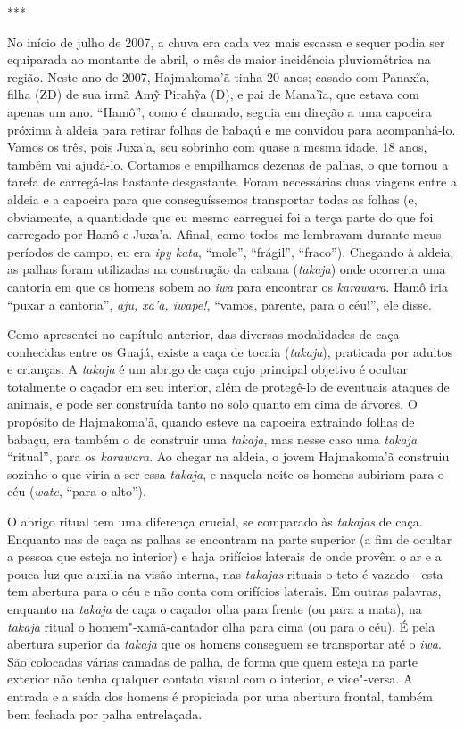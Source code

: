 ***

No início de julho de 2007, a chuva era cada vez mais escassa e sequer
podia ser equiparada ao montante de abril, o mês de maior incidência
pluviométrica na região. Neste ano de 2007, Hajmakoma'ã tinha 20 anos;
casado com Panaxĩa, filha (ZD) de sua irmã Amỹ Pirahỹa (D), e pai de
Mana'ĩa, que estava com apenas um ano. ``Hamô'', como é chamado, seguia
em direção a uma capoeira próxima à aldeia para retirar folhas de babaçú
e me convidou para acompanhá-lo. Vamos os três, pois Juxa'a, seu
sobrinho com quase a mesma idade, 18 anos, também vai ajudá-lo. Cortamos
e empilhamos dezenas de palhas, o que tornou a tarefa de carregá-las
bastante desgastante. Foram necessárias duas viagens entre a aldeia e a
capoeira para que conseguíssemos transportar todas as folhas (e,
obviamente, a quantidade que eu mesmo carreguei foi a terça parte do que
foi carregado por Hamô e Juxa'a. Afinal, como todos me lembravam durante
meus períodos de campo, eu era \emph{ipy kata}, ``mole'', ``frágil'',
``fraco''). Chegando à aldeia, as palhas foram utilizadas na construção da
cabana (\emph{takaja}) onde ocorreria uma cantoria em que os homens
sobem ao \emph{iwa} para encontrar os \emph{karawara}. Hamô iria ``puxar
a cantoria'', \emph{aju, xa'a, iwape!}, ``vamos, parente, para o céu!'',
ele disse.

Como apresentei no capítulo anterior, das diversas modalidades de caça
conhecidas entre os Guajá, existe a caça de tocaia (\emph{takaja}),
praticada por adultos e crianças. A \emph{takaja} é um abrigo de caça
cujo principal objetivo é ocultar totalmente o caçador em seu interior,
além de protegê-lo de eventuais ataques de animais, e pode ser
construída tanto no solo quanto em cima de árvores. O propósito de
Hajmakoma'ã, quando esteve na capoeira extraindo folhas de babaçu, era
também o de construir uma \emph{takaja}, mas nesse caso uma
\emph{takaja} ``ritual'', para os \emph{karawara}. Ao chegar na aldeia, o
jovem Hajmakoma'ã construiu sozinho o que viria a ser essa
\emph{takaja}, e naquela noite os homens subiriam para o céu
(\emph{wate}, ``para o alto'').

O abrigo ritual tem uma diferença crucial, se comparado às
\emph{takajas} de caça. Enquanto nas de caça as palhas se encontram na
parte superior (a fim de ocultar a pessoa que esteja no interior) e haja
orifícios laterais de onde provêm o ar e a pouca luz que auxilia na
visão interna, nas \emph{takajas} rituais o teto é vazado - esta tem
abertura para o céu e não conta com orifícios laterais. Em outras
palavras, enquanto na \emph{takaja} de caça o caçador olha para frente
(ou para a mata), na \emph{takaja} ritual o homem"-xamã-cantador olha
para cima (ou para o céu). É pela abertura superior da \emph{takaja} que
os homens conseguem se transportar até o \emph{iwa}. São colocadas
várias camadas de palha, de forma que quem esteja na parte exterior não
tenha qualquer contato visual com o interior, e vice"-versa. A entrada e
a saída dos homens é propiciada por uma abertura frontal, também bem
fechada por palha entrelaçada.

